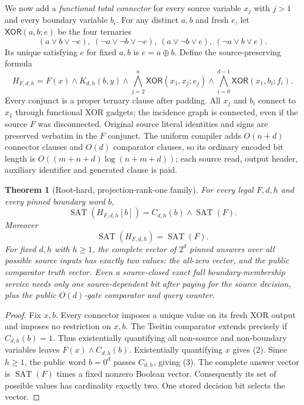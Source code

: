 \documentclass[11pt]{article}
\newtheorem{theorem}{Theorem}
\newcommand{\SAT}{\operatorname{SAT}}
\begin{document}
We now add a \emph{functional total connector} for every source variable
$x_j$ with $j>1$ and every boundary variable $b_i$. For any distinct
$a,b$ and fresh $e$, let $\mathsf{XOR}(a,b;e)$ be the four ternaries
\[
 (a\vee b\vee\neg e),\
 (\neg a\vee\neg b\vee\neg e),\
 (a\vee\neg b\vee e),\
 (\neg a\vee b\vee e).
\]
Its unique satisfying $e$ for fixed $a,b$ is $e=a\oplus b$.
Define the source-preserving formula
\[
 H_{F,d,h}=F(x)\land K_{d,h}(b,y)\land
 \bigwedge_{j=2}^n\mathsf{XOR}(x_1,x_j;e_j)
 \land\bigwedge_{i=0}^{d-1}\mathsf{XOR}(x_1,b_i;f_i).
 \tag{1}
\]
Every conjunct is a proper ternary clause after padding.
All $x_j$ and $b_i$ connect to $x_1$ through functional XOR gadgets;
the incidence graph is connected, even if the source $F$ was
disconnected. Original source literal identities and signs are
preserved verbatim in the $F$ conjunct. The uniform compiler adds
$O(n+d)$ connector clauses and $O(d)$ comparator clauses,
so its ordinary encoded bit length is
$O((m+n+d)\log(n+m+d))$; each source read, output header,
auxiliary identifier and generated clause is paid.

\begin{theorem}[Root-hard, projection-rank-one family]
For every legal $F,d,h$ and every pinned boundary word $b$,
\[
 \boxed{\SAT(H_{F,d,h}[b])=C_{d,h}(b)\wedge\SAT(F).} \tag{2}
\]
Moreover
\[
 \boxed{\SAT(H_{F,d,h})=\SAT(F).} \tag{3}
\]
For fixed $d,h$ with $h\ge1$, the complete vector of $2^d$ pinned
answers over all possible source inputs has exactly two values:
the all-zero vector, and the public comparator truth vector.
Even a source-closed exact \emph{full boundary-membership service}
needs only one source-dependent bit after paying for the source
decision, plus the public $O(d)$-gate comparator and query counter.
\end{theorem}
\begin{proof}
Fix $x,b$. Every connector imposes a unique value on its fresh XOR
output and imposes no restriction on $x,b$. The Tseitin comparator
extends precisely if $C_{d,h}(b)=1$. Thus existentially quantifying all
non-source and non-boundary variables leaves
$F(x)\wedge C_{d,h}(b)$. Existentially quantifying $x$ gives (2).
Since $h\ge1$, the public word $b=0^d$ passes $C_{d,h}$, giving (3).
The complete answer vector is $\SAT(F)$ times a fixed nonzero
Boolean vector. Consequently its set of possible values has
cardinality exactly two. One stored decision bit selects the vector.
\end{proof}
\end{document}
